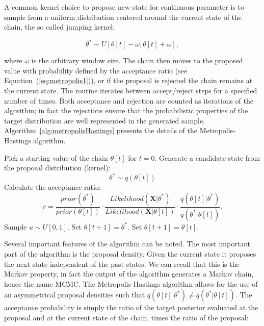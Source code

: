 A common kernel choice to propose new state for continuous parameter is to sample from a uniform distribution centered around the current state of the chain, the so called jumping kernel: %

$$\theta^{*}\sim U\left[\theta[t]-\omega,\theta[t]+\omega\right],$$

\noindent
where $\omega$ is the arbitrary window size.
The chain then moves to the proposed value with probability defined by the acceptance ratio (see Equation~(\ref{eq:metropolis1})), or if the proposal is rejected the chain remains at the current state.
The routine iterates between accept/reject steps for a specified number of times.
Both acceptance and rejection are counted as iterations of the algorithm; in fact the rejections ensure that the probabilistic properties of the target distribution are well represented in the generated sample.  
Algorithm~\ref{alg:metropolisHastings} presents the details of the Metropolis-Hastings algorithm.

\begin{algorithm}[H]
\centering
\begin{algorithmic}[1]
%
\State Pick a starting value of the chain $\theta \left[ t \right]$ for $t=0$.
%
%
\State Generate a candidate state from the proposal distribution (kernel):
$$\theta^{*} \sim q(\theta[t])$$
%
\State Calculate the acceptance ratio:
$$r=\frac{prior\left(\theta^{*}\right)}{prior\left(\theta\left[t\right]\right)}\cdot\frac{Likelihood\left(\mathbf{X}|\theta^{*}\right)}{Likelihood\left(\mathbf{X}|\theta\left[t\right]\right)}\cdot\frac{q\left(\theta\left[t\right]|\theta^{*}\right)}{q\left(\theta^{*}|\theta\left[t\right]\right)}.$$
%
\State Sample $u\sim U[0,1]$.
%
%
\State Set $\theta[t+1]=\theta^*.$
%
\Else 
%
\State Set $\theta[t+1]=\theta[t].$
%
\EndIf
%
\EndFor
\end{algorithmic}
\caption{
{ \footnotesize 
{\bf The Metropolis-Hastings algorithm} 
}%
}
\label{alg:metropolisHastings}
\end{algorithm}

Several important features of the algorithm can be noted.
The most important part of the algorithm is the proposal density. 
Given the current state it proposes the next state independent of the past states.
We can recall that this is the Markov property, in fact the output of the algorithm generates a Markov chain, hence the name MCMC.
The Metropolis-Hastings algorithm allows for the use of an asymmetrical proposal densities such that $q\left(\theta\left[t\right]|\theta^{*}\right)\neq q\left(\theta^{*}|\theta\left[t\right]\right)$.
The acceptance probability is simply the ratio of the target posterior evaluated at the proposal and at the current state of the chain, times the ratio of the proposal: 

